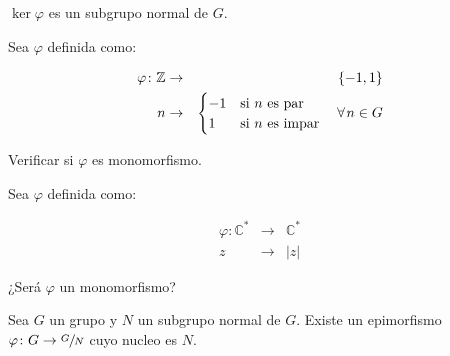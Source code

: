         \begin{observacion}
            $\ker{\varphi}$ es un subgrupo normal de $G$.
        \end{observacion}

        \begin{ejercicio}
            Sea $\varphi$ definida como:

            \begin{eqnarray*}
                \varphi \colon \mathbb{Z} & \to & \left\{ -1, 1 \right\} \\
                n & \to &
                \begin{cases}
                    -1 & \text{si } n \text{ es par} \\
                    1 & \text{si } n \text{ es impar}
                    \end{cases} \quad \forall \mkern2mu n \in G
            \end{eqnarray*}

            Verificar si $\varphi$ es monomorfismo.
        \end{ejercicio}

        \begin{ejercicio}
            Sea $\varphi$ definida como:

            \begin{eqnarray*}
                \varphi \colon \mathbb{C}^* & \to & \mathbb{C}^* \\
                z & \to & |z|
            \end{eqnarray*}

            ¿Será $\varphi$ un monomorfismo?
        \end{ejercicio}

        \begin{proposicion}
            Sea $G$ un grupo y $N$ un subgrupo normal de $G$.
            Existe un epimorfismo $\varphi \colon G \to \sfrac{G}{N}$ cuyo nucleo es $N$.
        \end{proposicion}

